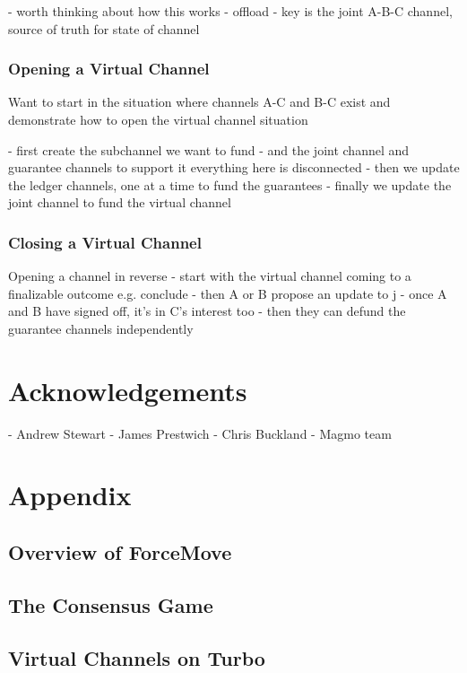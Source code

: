 \documentclass{article}
\theoremstyle{definition}
\begin{document}


- worth thinking about how this works
- offload
- key is the joint A-B-C channel, source of truth for state of channel


\subsubsection{Opening a Virtual Channel}

Want to start in the situation where channels A-C and B-C exist and demonstrate how to
open the virtual channel situation

- first create the subchannel we want to fund
- and the joint channel and guarantee channels to support it
everything here is disconnected
- then we update the ledger channels, one at a time to fund the guarantees
- finally we update the joint channel to fund the virtual channel

\subsubsection{Closing a Virtual Channel}

Opening a channel in reverse
- start with the virtual channel coming to a finalizable outcome e.g. conclude
- then A or B propose an update to j
- once A and B have signed off, it's in C's interest too
- then they can defund the guarantee channels independently


\section{Acknowledgements}

- Andrew Stewart
- James Prestwich
- Chris Buckland
- Magmo team


\section{Appendix}

\subsection{Overview of ForceMove}
\subsection{The Consensus Game}
\subsection{Virtual Channels on Turbo}
\end{document}
